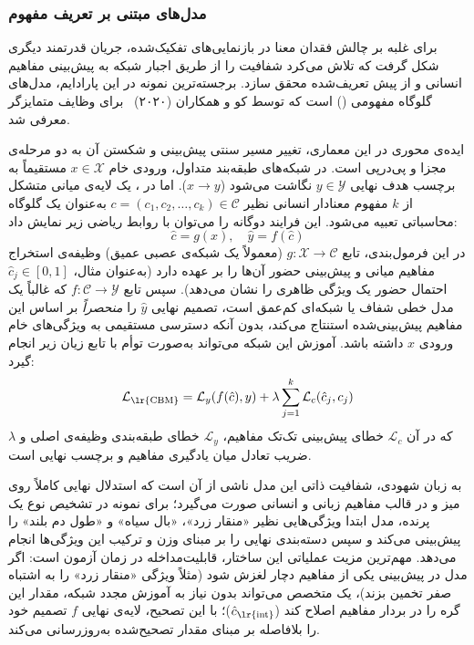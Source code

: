 \subsubsection{مدل‌های مبتنی بر تعریف مفهوم}\label{sec:3-1-1-3}

برای غلبه بر چالش فقدان معنا در بازنمایی‌های تفکیک‌شده، جریان قدرتمند دیگری شکل گرفت که تلاش می‌کرد شفافیت را از طریق اجبار شبکه به پیش‌بینی مفاهیم انسانی و از پیش تعریف‌شده محقق سازد. برجسته‌ترین نمونه در این پارادایم، مدل‌های گلوگاه مفهومی () است که توسط کو و همکاران (۲۰۲۰)~\cite{koh2020cbm} برای وظایف متمایزگر معرفی شد.

ایده‌ی محوری در این معماری، تغییر مسیر سنتی پیش‌بینی و شکستن آن به دو مرحله‌ی مجزا و پی‌درپی است. در شبکه‌های طبقه‌بند متداول، ورودی خام $x \in \mathcal{X}$ مستقیماً به برچسب هدف نهایی $y \in \mathcal{Y}$ نگاشت می‌شود ($x \rightarrow y$). اما در ، یک لایه‌ی میانی متشکل از $k$ مفهوم معنادار انسانی نظیر $c = (c_1, c_2, \dots, c_k) \in \mathcal{C}$ به‌عنوان یک گلوگاه محاسباتی تعبیه می‌شود. این فرایند دوگانه را می‌توان با روابط ریاضی زیر نمایش داد:
\begin{equation}\label{eq:chap3_cbm}
    \hat{c} = g(x), \quad \hat{y} = f(\hat{c})
\end{equation}
در این فرمول‌بندی، تابع $g: \mathcal{X} \rightarrow \mathcal{C}$ (معمولاً یک شبکه‌ی عصبی عمیق) وظیفه‌ی استخراج مفاهیم میانی و پیش‌بینی حضور آن‌ها را بر عهده دارد (به‌عنوان مثال، $\hat{c}_j \in [0, 1]$ احتمال حضور یک ویژگی ظاهری را نشان می‌دهد). سپس تابع $f: \mathcal{C} \rightarrow \mathcal{Y}$ که غالباً یک مدل خطی شفاف یا شبکه‌ای کم‌عمق است، تصمیم نهایی $\hat{y}$ را \textit{منحصراً} بر اساس این مفاهیم پیش‌بینی‌شده استنتاج می‌کند، بدون آنکه دسترسی مستقیمی به ویژگی‌های خام ورودی $x$ داشته باشد. آموزش این شبکه می‌تواند به‌صورت توأم با تابع زیان زیر انجام گیرد:
\begin{equation}\label{eq:chap3_cbm_loss}
    \mathcal{L}_{\text{\lr{CBM}}} = \mathcal{L}_y(f(\hat{c}), y) + \lambda \sum_{j=1}^k \mathcal{L}_c(\hat{c}_j, c_j)
\end{equation}
که در آن $\mathcal{L}_c$ خطای پیش‌بینی تک‌تک مفاهیم، $\mathcal{L}_y$ خطای طبقه‌بندی وظیفه‌ی اصلی و $\lambda$ ضریب تعادل میان یادگیری مفاهیم و برچسب نهایی است. 

به زبان شهودی، شفافیت ذاتی این مدل ناشی از آن است که استدلال نهایی کاملاً روی میز و در قالب مفاهیم زبانی و انسانی صورت می‌گیرد؛ برای نمونه در تشخیص نوع یک پرنده، مدل ابتدا ویژگی‌هایی نظیر «منقار زرد»، «بال سیاه» و «طول دم بلند» را پیش‌بینی می‌کند و سپس دسته‌بندی نهایی را بر مبنای وزن و ترکیب این ویژگی‌ها انجام می‌دهد. مهم‌ترین مزیت عملیاتی این ساختار، قابلیت‌مداخله در زمان آزمون است: اگر مدل در پیش‌بینی یکی از مفاهیم دچار لغزش شود (مثلاً ویژگی «منقار زرد» را به اشتباه صفر تخمین بزند)، یک متخصص می‌تواند بدون نیاز به آموزش مجدد شبکه، مقدار این گره را در بردار مفاهیم اصلاح کند ($\hat{c}_{\text{\lr{int}}}$)؛ با این تصحیح، لایه‌ی نهایی $f$ تصمیم خود را بلافاصله بر مبنای مقدار تصحیح‌شده به‌روزرسانی می‌کند.

